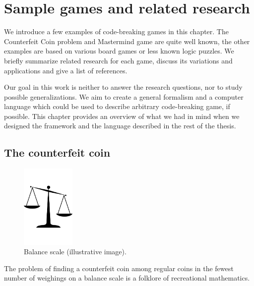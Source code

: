 \chapter{Sample games and related research}
\label{ch:games}
We introduce a few examples of code-breaking games in this chapter.
The Counterfeit Coin problem and Mastermind game are quite well known,
  the other examples are based on various board games or less known
  logic puzzles.
We briefly summarize related research for each game, discuss
  its variations and applications and give a list of
  references.

Our goal in this work is neither to answer the research questions, nor
  to study possible generalizations.
We aim to create a general formalism and a computer language which could
  be used to describe arbitrary code-breaking game, if possible.
This chapter provides an overview of what we had in mind
  when we designed the framework and the language described
  in the rest of the thesis.

\section{The counterfeit coin} \label{s:coins}

\begin{figure}
  \begin{center}
  \vspace{-5mm}
  \includegraphics[width=0.23\textwidth]{pictures/scales.pdf}
  \vspace{-5mm}
  \end{center}
  \caption{Balance scale (illustrative image)\protect\footnotemark.}
  \vspace{-10mm}
\end{figure}

The problem of finding a counterfeit coin among regular coins in the fewest
  number of weighings on a balance scale is a folklore of
  recreational mathematics.

